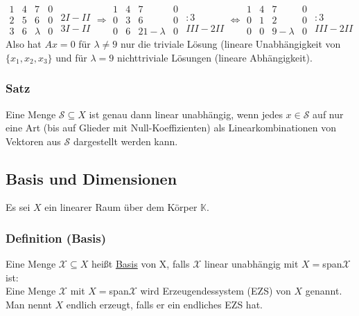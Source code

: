 \begin{enumerate}
\[\begin{array}{ccc|c}1 & 4 & 7 & 0\\ 2 & 5 & 6 & 0\\ 3 & 6 & \lambda&0 \end{array}\begin{matrix}\\ 2I-II\\ 3I-II\end{matrix} \Rightarrow \begin{array}{ccc|c}1 & 4 & 7 & 0\\ 0 & 3 & 6 & 0\\ 0 & 6 & 21 - \lambda & 0 \end{array}\begin{matrix}\\ :3\\ III-2II\end{matrix} \Leftrightarrow \begin{array}{ccc|c}1 & 4 & 7 & 0\\ 0 & 1 & 2 & 0\\ 0 & 0 & 9 - \lambda & 0 \end{array}\begin{matrix}\\ :3\\ III-2II\end{matrix}\]
Also hat $Ax=0$ für $\lambda \not= 9$ nur die triviale Lösung (lineare Unabhängigkeit von $\{x_1,x_2,x_3\}$ und für $\lambda = 9$ nichttriviale Lösungen (lineare Abhängigkeit).
\end{enumerate}
\subsubsection{Satz}
Eine Menge $\mathcal{S}\subseteq X$ ist genau dann linear unabhängig, wenn jedes $x\in\mathcal{S}$ auf nur eine Art (bis auf Glieder mit Null-Koeffizienten) als Linearkombinationen von Vektoren aus $\mathcal{S}$ dargestellt werden kann.
\subsection{Basis und Dimensionen}
Es sei $X$ ein linearer Raum über dem Körper $\mathbb{K}$.
\subsubsection{Definition (Basis)}
Eine Menge $\mathcal{X}\subseteq X$ heißt \underline{Basis} von X, falls $\mathcal{X}$ linear unabhängig mit $X=$span$\mathcal{X}$ ist:\\
Eine Menge $\mathcal{X}$ mit $X=$span$\mathcal{X}$ wird Erzeugendessystem (EZS) von $X$ genannt.  Man nennt $X$ endlich erzeugt, falls er ein endliches EZS hat.

